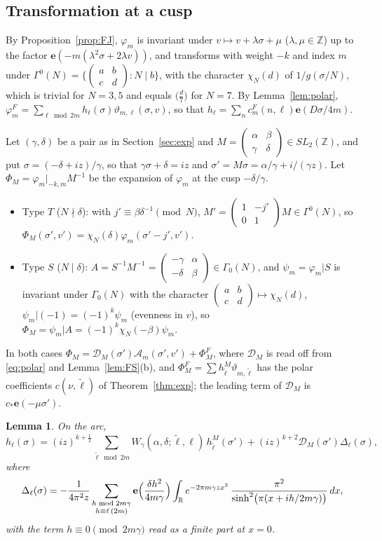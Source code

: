 \documentclass[11pt]{amsart}
\numberwithin{equation}{section}
\theoremstyle{plain}
\newtheorem{lem}[thm]{Lemma}
\theoremstyle{definition}
\theoremstyle{remark}
\newcommand{\Z}{\mathbb{Z}}
\newcommand{\R}{\mathbb{R}}
\newcommand{\cA}{\mathcal{A}}
\newcommand{\e}{\mathbf{e}}
\newcommand{\sm}[4]{\left(\begin{smallmatrix}#1&#2\\#3&#4\end{smallmatrix}\right)}
\begin{document}
\subsection{Transformation at a cusp}
By Proposition~\ref{prop:FJ}, $\varphi_m$ is invariant under $v\mapsto v+\lambda\sigma+\mu$ ($\lambda,\mu\in\Z$) up to the factor $\e(-m(\lambda^2\sigma+2\lambda v))$, and transforms with weight $-k$ and index $m$ under $\Gamma^0(N)=\{\sm abcd:N\mid b\}$, with the character $\chi_N(d)$ of $1/g(\sigma/N)$, which is trivial for $N=3,5$ and equals $\bigl(\frac d7\bigr)$ for $N=7$. By Lemma~\ref{lem:polar}, $\varphi^F_m=\sum_{\ell\bmod2m}h_\ell(\sigma)\vartheta_{m,\ell}(\sigma,v)$, so that $h_\ell=\sum_nc^F_m(n,\ell)\e(D\sigma/4m)$.

Let $(\gamma,\delta)$ be a pair as in Section~\ref{sec:exp} and $M=\sm\alpha\beta\gamma\delta\in SL_2(\Z)$, and put $\sigma=(-\delta+iz)/\gamma$, so that $\gamma\sigma+\delta=iz$ and $\sigma'=M\sigma=\alpha/\gamma+i/(\gamma z)$. Let $\Phi_M=\varphi_m|_{-k,m}M^{-1}$ be the expansion of $\varphi_m$ at the cusp $-\delta/\gamma$.
\begin{itemize}
\item Type $T$ ($N\nmid\delta$): with $j'\equiv\beta\delta^{-1}\pmod N$, $M'=\sm1{-j'}01M\in\Gamma^0(N)$, so $\Phi_M(\sigma',v')=\chi_N(\delta)\varphi_m(\sigma'-j',v')$.
\item Type $S$ ($N\mid\delta$): $A=S^{-1}M^{-1}=\sm{-\gamma}\alpha{-\delta}\beta\in\Gamma_0(N)$, and $\psi_m=\varphi_m|S$ is invariant under $\Gamma_0(N)$ with the character $\sm abcd\mapsto\chi_N(d)$, $\psi_m|(-1)=(-1)^k\psi_m$ (evenness in $v$), so $\Phi_M=\psi_m|A=(-1)^k\chi_N(-\beta)\psi_m$.
\end{itemize}
In both cases $\Phi_M=\mathcal D_M(\sigma')\cA_m(\sigma',v')+\Phi_M^F$, where $\mathcal D_M$ is read off from \eqref{eq:polar} and Lemma~\ref{lem:FS}(b), and $\Phi^F_M=\sum h^M_{\tilde\ell}\vartheta_{m,\tilde\ell}$ has the polar coefficients $c(\nu,\tilde\ell)$ of Theorem~\ref{thm:exp}; the leading term of $\mathcal D_M$ is $c_*\e(-\mu\sigma')$.

\begin{lem}\label{lem:transf}
On the arc,
\[
h_\ell(\sigma)=(iz)^{k+\frac12}\sum_{\tilde\ell\bmod2m}W_\gamma(\alpha,\delta;\tilde\ell,\ell)\,h^M_{\tilde\ell}(\sigma')+(iz)^{k+2}\mathcal D_M(\sigma')\Delta_\ell(\sigma),
\]
where
\begin{equation}\label{eq:Deltal}
\Delta_\ell(\sigma)=-\frac{1}{4\pi^2z}\sum_{\substack{h\bmod2m\gamma\\ h\equiv\ell\,(2m)}}\e\Bigl(\frac{\delta h^2}{4m\gamma}\Bigr)\int_{\R}e^{-2\pi m\gamma zx^2}\,\frac{\pi^2}{\sinh^2\bigl(\pi(x+ih/2m\gamma)\bigr)}\,dx,
\end{equation}
with the term $h\equiv0\pmod{2m\gamma}$ read as a finite part at $x=0$.
\end{lem}
\end{document}
